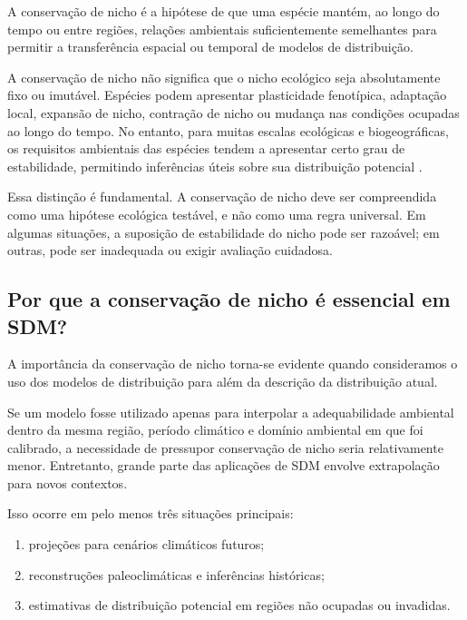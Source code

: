 \begin{conceito}
	A conservação de nicho é a hipótese de que uma espécie mantém, ao longo do tempo ou entre regiões, relações ambientais suficientemente semelhantes para permitir a transferência espacial ou temporal de modelos de distribuição.
\end{conceito}

A conservação de nicho não significa que o nicho ecológico seja absolutamente fixo ou imutável. Espécies podem apresentar plasticidade fenotípica, adaptação local, expansão de nicho, contração de nicho ou mudança nas condições ocupadas ao longo do tempo. No entanto, para muitas escalas ecológicas e biogeográficas, os requisitos ambientais das espécies tendem a apresentar certo grau de estabilidade, permitindo inferências úteis sobre sua distribuição potencial \parencite{wiens2010,peterson2011}.

Essa distinção é fundamental. A conservação de nicho deve ser compreendida como uma hipótese ecológica testável, e não como uma regra universal. Em algumas situações, a suposição de estabilidade do nicho pode ser razoável; em outras, pode ser inadequada ou exigir avaliação cuidadosa.

\subsection{Por que a conservação de nicho é essencial em SDM?}

A importância da conservação de nicho torna-se evidente quando consideramos o uso dos modelos de distribuição para além da descrição da distribuição atual.

Se um modelo fosse utilizado apenas para interpolar a adequabilidade ambiental dentro da mesma região, período climático e domínio ambiental em que foi calibrado, a necessidade de pressupor conservação de nicho seria relativamente menor. Entretanto, grande parte das aplicações de SDM envolve extrapolação para novos contextos.

Isso ocorre em pelo menos três situações principais:

\begin{enumerate}
	
	\item projeções para cenários climáticos futuros;
	
	\item reconstruções paleoclimáticas e inferências históricas;
	
	\item estimativas de distribuição potencial em regiões não ocupadas ou invadidas.
	
\end{enumerate}

